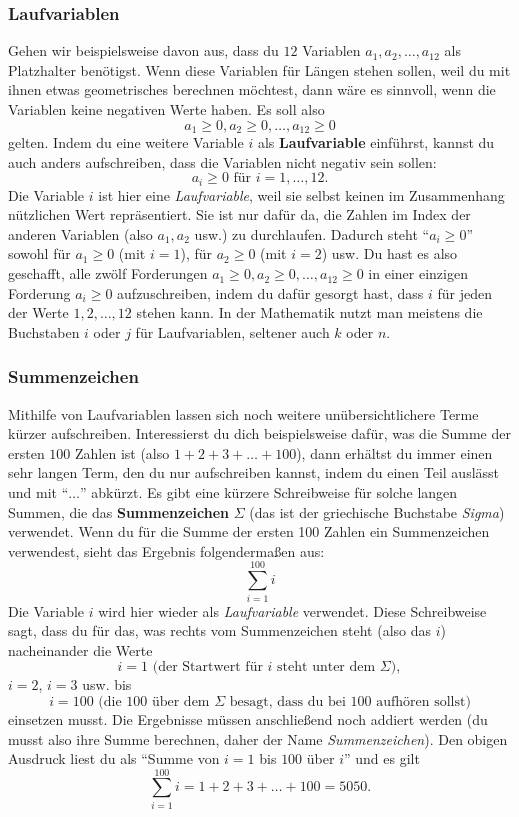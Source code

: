 \documentclass[../../main.tex]{subfiles}
\begin{document}
\subsubsection*{Laufvariablen}
Gehen wir beispielsweise davon aus, dass du $12$ Variablen $a_1,a_2,\dots,a_{12}$ als Platzhalter benötigst. Wenn diese Variablen für Längen stehen sollen, weil du mit ihnen etwas geometrisches berechnen möchtest, dann wäre es sinnvoll, wenn die Variablen keine negativen Werte haben. Es soll also 
\[a_1\geq 0, a_2\geq 0,\dots,a_{12}\geq 0\] 
gelten. Indem du eine weitere Variable $i$ als \textbf{Laufvariable} einführst, kannst du auch anders aufschreiben, dass die Variablen nicht negativ sein sollen: 
\[a_i\geq 0 \text{ für } i=1,\dots,12.\]
Die Variable $i$ ist hier eine \emph{Laufvariable}, weil sie selbst keinen im Zusammenhang nützlichen Wert repräsentiert. Sie ist nur dafür da, die Zahlen im Index der anderen Variablen (also $a_1,a_2$ usw.) zu durchlaufen. Dadurch steht \enquote{$a_i\geq 0$} sowohl für $a_1\geq 0$ (mit $i=1$), für $a_2\geq 0$ (mit $i=2$) usw. Du hast es also geschafft, alle zwölf Forderungen $a_1\geq 0, a_2\geq 0,\dots,a_{12}\geq 0$ in einer einzigen Forderung $a_i\geq 0$ aufzuschreiben, indem du dafür gesorgt hast, dass $i$ für jeden der Werte $1,2,\dots,12$ stehen kann. In der Mathematik nutzt man meistens die Buchstaben $i$ oder $j$ für Laufvariablen, seltener auch $k$ oder $n$.

\subsubsection*{Summenzeichen}
Mithilfe von Laufvariablen lassen sich noch weitere unübersichtlichere Terme kürzer aufschreiben. Interessierst du dich beispielsweise dafür, was die Summe der ersten $100$ Zahlen ist (also $1+2+3+\dots+100$), dann erhältst du immer einen sehr langen Term, den du nur aufschreiben kannst, indem du einen Teil auslässt und mit \enquote{$\dots$} abkürzt. Es gibt eine kürzere Schreibweise für solche langen Summen, die das \textbf{Summenzeichen} $\Sigma$ (das ist der griechische Buchstabe \emph{Sigma}) verwendet. Wenn du für die Summe der ersten 100 Zahlen ein Summenzeichen verwendest, sieht das Ergebnis folgendermaßen aus:
\[\sum_{i=1}^{100}i\]
Die Variable $i$ wird hier wieder als \emph{Laufvariable} verwendet. Diese Schreibweise sagt, dass du für das, was rechts vom Summenzeichen steht (also das $i$) nacheinander die Werte \[i=1 \text{ (der Startwert für $i$ steht unter dem }\Sigma),\]
$i=2$, $i=3$ usw. bis \[i=100 \text{ (die 100 über dem }\Sigma\text{ besagt, dass du bei $100$ aufhören sollst)}\]
einsetzen musst. Die Ergebnisse müssen anschließend noch addiert werden (du musst also ihre Summe berechnen, daher der Name \emph{Summenzeichen}). Den obigen Ausdruck liest du als \enquote{Summe von $i=1$ bis $100$ über $i$} und es gilt
\[\sum_{i=1}^{100}i=1+2+3+\dots+100=5050.\]
\end{document}
